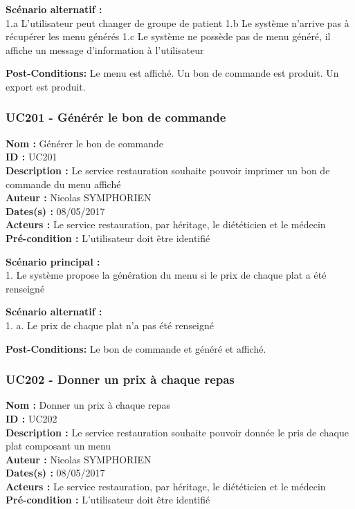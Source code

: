 \textbf{Scénario alternatif :}\\
1.a L'utilisateur peut changer de groupe de patient 1.b Le système
n'arrive pas à récupérer les menu générés 1.c Le système ne possède pas
de menu généré, il affiche un message d'information à l'utilisateur

\textbf{Post-Conditions:} Le menu est affiché. Un bon de commande est
produit. Un export est produit.

\subsubsection{UC201 - Générér le bon de
commande}\label{uc201---guxe9nuxe9ruxe9r-le-bon-de-commande}

\noindent\textbf{Nom :} Générer le bon de commande\\
\textbf{ID :} UC201\\
\textbf{Description :} Le service restauration souhaite pouvoir imprimer
un bon de commande du menu affiché\\
\textbf{Auteur :} Nicolas SYMPHORIEN\\
\textbf{Dates(s) :} 08/05/2017\\
\textbf{Acteurs :} Le service restauration, par héritage, le diététicien
et le médecin\\
\textbf{Pré-condition :} L'utilisateur doit être identifié

\textbf{Scénario principal :}\\
1. Le système propose la génération du menu si le prix de chaque plat a
été renseigné

\textbf{Scénario alternatif :}\\
1. a. Le prix de chaque plat n'a pas été renseigné

\textbf{Post-Conditions:} Le bon de commande et généré et affiché.

\subsubsection{UC202 - Donner un prix à chaque
repas}\label{uc202---donner-un-prix-uxe0-chaque-repas}

\noindent\textbf{Nom :} Donner un prix à chaque repas\\
\textbf{ID :} UC202\\
\textbf{Description :} Le service restauration souhaite pouvoir donnée
le pris de chaque plat composant un menu\\
\textbf{Auteur :} Nicolas SYMPHORIEN\\
\textbf{Dates(s) :} 08/05/2017\\
\textbf{Acteurs :} Le service restauration, par héritage, le diététicien
et le médecin\\
\textbf{Pré-condition :} L'utilisateur doit être identifié

